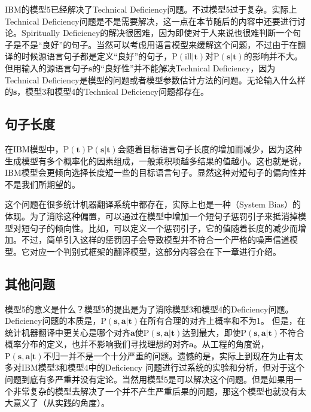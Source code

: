 \parinterval IBM的模型5已经解决了Technical Deficiency问题。不过模型5过于复杂。实际上Technical Deficiency问题是不是需要解决，这一点在本节随后的内容中还要进行讨论。Spiritually Deficiency的解决很困难，因为即使对于人来说也很难判断一个句子是不是``良好''的句子。当然可以考虑用语言模型来缓解这个问题，不过由于在翻译的时候源语言句子都是定义``良好''的句子，$\textrm{P}({\textrm{ill}|\mathbf{t}})$对$\textrm{P}(\mathbf{s}| \mathbf{t})$的影响并不大。但用输入的源语言句子$\mathbf{s}$的``良好性''并不能解决Technical Deficiency，因为Technical Deficiency是模型的问题或者模型参数估计方法的问题。无论输入什么样的$\mathbf{s}$，模型3和模型4的Technical Deficiency问题都存在。


\subsection{句子长度}


\parinterval 在IBM模型中，$\textrm{P}(\mathbf{t})\textrm{P}(\mathbf{s}| \mathbf{t})$会随着目标语言句子长度的增加而减少，因为这种生成模型有多个概率化的因素组成，一般乘积项越多结果的值越小。这也就是说，IBM模型会更倾向选择长度短一些的目标语言句子。显然这种对短句子的偏向性并不是我们所期望的。

\parinterval 这个问题在很多统计机器翻译系统中都存在，实际上也是一种{\small{}}（System Bias）的体现。为了消除这种偏置，可以通过在模型中增加一个短句子惩罚引子来抵消掉模型对短句子的倾向性。比如，可以定义一个惩罚引子，它的值随着长度的减少而增加。不过，简单引入这样的惩罚因子会导致模型并不符合一个严格的噪声信道模型。它对应一个判别式框架的翻译模型，这部分内容会在下一章进行介绍。


\subsection{其他问题}

\parinterval 模型5的意义是什么？模型5的提出是为了消除模型3和模型4的Deficiency问题。Deficiency问题的本质是，$\textrm{P}(\mathbf{s},\mathbf{a}| \mathbf{t})$在所有合理的对齐上概率和不为1。 但是，在统计机器翻译中更关心是哪个对齐$\mathbf{a}$使$\textrm{P}(\mathbf{s},\mathbf{a}| \mathbf{t})$达到最大，即使$\textrm{P}(\mathbf{s},\mathbf{a}|\mathbf{t})$不符合概率分布的定义，也并不影响我们寻找理想的对齐$\mathbf{a}$。从工程的角度说，$\textrm{P}(\mathbf{s},\mathbf{a}| \mathbf{t})$不归一并不是一个十分严重的问题。遗憾的是，实际上到现在为止有太多对IBM模型3和模型4中的Deficiency 问题进行过系统的实验和分析，但对于这个问题到底有多严重并没有定论。当然用模型5是可以解决这个问题。但是如果用一个非常复杂的模型去解决了一个并不产生严重后果的问题，那这个模型也就没有太大意义了（从实践的角度）。

